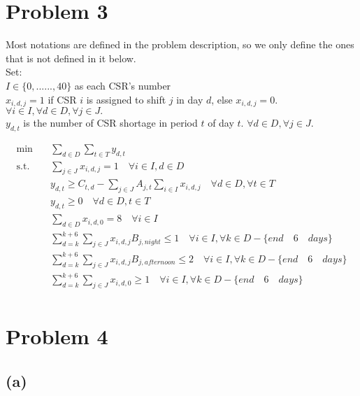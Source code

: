\documentclass[12pt, a4paper]{article}
\begin{document}
\section{Problem 3}

Most notations are defined in the problem description, so we only define the ones that is not defined in it below.\\
Set:\\
$I \in \{{0,......,40}\}$ as each CSR's number\\
$x_{i,d,j} = 1$ if CSR $i$ is assigned to shift $j$ in day $d$, else $x_{i,d,j} = 0$. $\forall i \in I, \forall d \in D, \forall j \in J.$\\
$y_{d,t}$ is the number of CSR shortage in period $t$ of day $t$. $\forall d \in D, \forall j \in J.$

\begin{equation}\label{eq:LP}\begin{split}
	\min \quad & \sum_{d \in D} \sum_{t \in T} y_{d, t}\\
	\mbox{s.t.} \quad 
	& \sum_{j \in J} x_{i, d, j} = 1 \quad \forall i \in I, d \in D\\
	& y_{d, t} \geq C_{t,d} - \sum_{j \in J} A_{j, t} \sum_{i \in I} x_{i, d, j} \quad \forall d \in D, \forall t \in T\\
	& y_{d, t} \geq 0 \quad \forall d \in D, t \in T\\
	& \sum_{d \in D} x_{i,d,0} = 8 \quad \forall i \in I\\
	& \sum_{d = k}^{k + 6} \sum_{j \in J} x_{i,d,j} B_{j, night} \leq 1 \quad \forall i \in I, \forall k \in D - \{end \quad 6 \quad days\}\\ 
	& \sum_{d = k}^{k + 6} \sum_{j \in J} x_{i,d,j} B_{j, afternoon} \leq 2 \quad \forall i \in I, \forall k \in D - \{end \quad 6 \quad days\}\\
	& \sum_{d = k}^{k + 6} \sum_{j \in J} x_{i,d,0} \geq 1 \quad \forall i \in I, \forall k \in D - \{end \quad 6 \quad days\}\\
\end{split}\end{equation}


\section{Problem 4}

\subsection{(a)}
\end{document}
